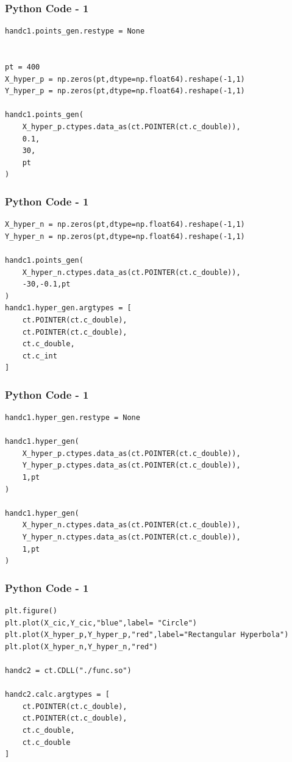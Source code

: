 \documentclass{beamer}
\begin{document}
\begin{frame}[fragile]
    \frametitle{Python Code - 1}
    \begin{lstlisting}
handc1.points_gen.restype = None


pt = 400
X_hyper_p = np.zeros(pt,dtype=np.float64).reshape(-1,1)
Y_hyper_p = np.zeros(pt,dtype=np.float64).reshape(-1,1)

handc1.points_gen(
    X_hyper_p.ctypes.data_as(ct.POINTER(ct.c_double)),
    0.1,
    30,
    pt 
)

\end{lstlisting}
\end{frame}

\begin{frame}[fragile]
    \frametitle{Python Code - 1}
    \begin{lstlisting}
X_hyper_n = np.zeros(pt,dtype=np.float64).reshape(-1,1)
Y_hyper_n = np.zeros(pt,dtype=np.float64).reshape(-1,1)

handc1.points_gen(
    X_hyper_n.ctypes.data_as(ct.POINTER(ct.c_double)),
    -30,-0.1,pt
)
handc1.hyper_gen.argtypes = [
    ct.POINTER(ct.c_double),
    ct.POINTER(ct.c_double),
    ct.c_double,
    ct.c_int 
]
\end{lstlisting}
\end{frame}


\begin{frame}[fragile]
    \frametitle{Python Code - 1}
    \begin{lstlisting}
handc1.hyper_gen.restype = None

handc1.hyper_gen(
    X_hyper_p.ctypes.data_as(ct.POINTER(ct.c_double)),
    Y_hyper_p.ctypes.data_as(ct.POINTER(ct.c_double)),
    1,pt
)

handc1.hyper_gen(
    X_hyper_n.ctypes.data_as(ct.POINTER(ct.c_double)),
    Y_hyper_n.ctypes.data_as(ct.POINTER(ct.c_double)),
    1,pt
)

\end{lstlisting}
\end{frame}

\begin{frame}[fragile]
    \frametitle{Python Code - 1}
    \begin{lstlisting}
plt.figure()
plt.plot(X_cic,Y_cic,"blue",label= "Circle")
plt.plot(X_hyper_p,Y_hyper_p,"red",label="Rectangular Hyperbola")
plt.plot(X_hyper_n,Y_hyper_n,"red")

handc2 = ct.CDLL("./func.so")

handc2.calc.argtypes = [
    ct.POINTER(ct.c_double),
    ct.POINTER(ct.c_double),
    ct.c_double,
    ct.c_double
]
\end{lstlisting}
\end{frame}
\end{document}
